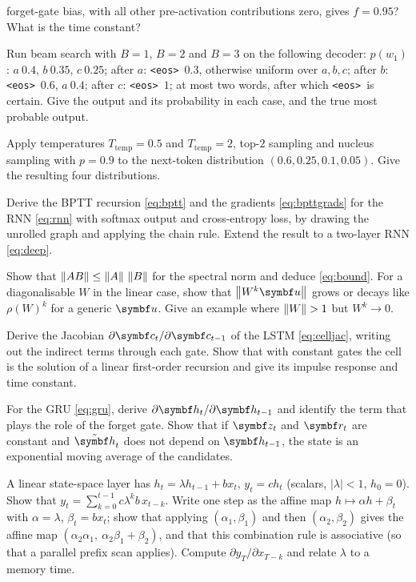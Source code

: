 \documentclass[11pt]{article}
\newcommand{\hv}{\vect{h}}
\newcommand{\cv}{\vect{c}}
\newcommand{\zv}{\vect{z}}
\newcommand{\rv}{\vect{r}}
\newcommand{\htil}{\tilde{\vect{h}}}
\newcommand{\eos}{\texttt{<eos>}}
\begin{document}
\begin{questions}
\begin{calculations}
  forget-gate bias, with all other pre-activation contributions zero, gives $f = 0.95$? What is the time constant?
\item Run beam search with $B = 1$, $B = 2$ and $B = 3$ on the following decoder: $p(w_1)$: $a\ 0.4$, $b\ 0.35$, $c\ 0.25$;
  after $a$: \eos\ $0.3$, otherwise uniform over $a, b, c$; after $b$: \eos\ $0.6$, $a\ 0.4$; after $c$: \eos\ $1$; at most two
  words, after which \eos\ is certain. Give the output and its probability in each case, and the true most probable output.
\item Apply temperatures $T_{\mathrm{temp}} = 0.5$ and $T_{\mathrm{temp}} = 2$, top-$2$ sampling and nucleus sampling with $p = 0.9$ to the next-token
  distribution $(0.6, 0.25, 0.1, 0.05)$. Give the resulting four distributions.
\end{calculations}

\begin{derivations}
\item Derive the BPTT recursion \eqref{eq:bptt} and the gradients \eqref{eq:bpttgrads} for the RNN \eqref{eq:rnn} with softmax
  output and cross-entropy loss, by drawing the unrolled graph and applying the chain rule. Extend the result to a two-layer
  RNN \eqref{eq:deep}.
\item Show that $\left\lVert AB \right\rVert \le \left\lVert A \right\rVert\,\left\lVert B \right\rVert$ for the spectral norm and deduce \eqref{eq:bound}. For a diagonalisable $W$ in
  the linear case, show that $\norm{W^k\vect{u}}$ grows or decays like $\rho(W)^k$ for a generic $\vect{u}$. Give an example
  where $\left\lVert W \right\rVert > 1$ but $W^k \to 0$.
\item Derive the Jacobian $\partial\cv_t/\partial\cv_{t-1}$ of the LSTM \eqref{eq:celljac}, writing out the indirect terms through
  each gate. Show that with constant gates the cell is the solution of a linear first-order recursion and give its
  impulse response and time constant.
\item For the GRU \eqref{eq:gru}, derive $\partial\hv_t/\partial\hv_{t-1}$ and identify the term that plays the role of the
  forget gate. Show that if $\zv_t$ and $\rv_t$ are constant and $\htil_t$ does not depend on $\hv_{t-1}$, the state is an
  exponential moving average of the candidates.
\item A linear state-space layer has $h_t = \lambda h_{t-1} + bx_t$, $y_t = ch_t$ (scalars, $|\lambda| < 1$, $h_0 = 0$). Show that
  $y_t = \sum_{k=0}^{t-1} c\lambda^kb\,x_{t-k}$. Write one step as the affine map $h \mapsto \alpha h + \beta_t$ with
  $\alpha = \lambda$, $\beta_t = bx_t$; show that applying $(\alpha_1, \beta_1)$ and then $(\alpha_2, \beta_2)$ gives the affine
  map $(\alpha_2\alpha_1,\ \alpha_2\beta_1 + \beta_2)$, and that this combination rule is associative (so that a parallel
  prefix scan applies). Compute $\partial y_T/\partial x_{T-k}$ and relate $\lambda$ to a memory time.
\end{derivations}


\end{questions}
\end{document}
